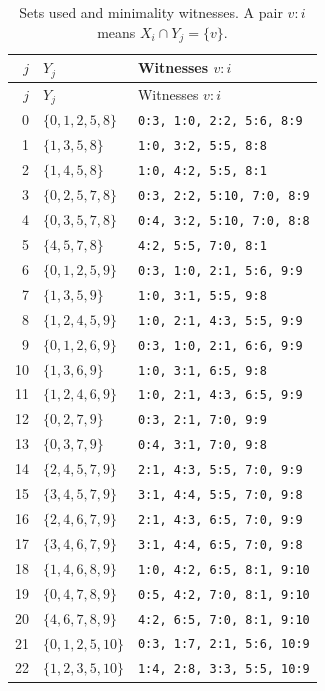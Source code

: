 \documentclass[11pt]{article}
\begin{document}
\begin{longtable}{rll}
\caption{Sets used and minimality witnesses. A pair $v:i$ means $X_i\cap Y_j=\{v\}$.}\label{tab:witness}\\
\toprule $j$&$Y_j$&Witnesses $v:i$\\\midrule\endfirsthead
\toprule $j$&$Y_j$&Witnesses $v:i$\\\midrule\endhead
0 & $\{0,1,2,5,8\}$ & \texttt{0:3, 1:0, 2:2, 5:6, 8:9} \\
1 & $\{1,3,5,8\}$ & \texttt{1:0, 3:2, 5:5, 8:8} \\
2 & $\{1,4,5,8\}$ & \texttt{1:0, 4:2, 5:5, 8:1} \\
3 & $\{0,2,5,7,8\}$ & \texttt{0:3, 2:2, 5:10, 7:0, 8:9} \\
4 & $\{0,3,5,7,8\}$ & \texttt{0:4, 3:2, 5:10, 7:0, 8:8} \\
5 & $\{4,5,7,8\}$ & \texttt{4:2, 5:5, 7:0, 8:1} \\
6 & $\{0,1,2,5,9\}$ & \texttt{0:3, 1:0, 2:1, 5:6, 9:9} \\
7 & $\{1,3,5,9\}$ & \texttt{1:0, 3:1, 5:5, 9:8} \\
8 & $\{1,2,4,5,9\}$ & \texttt{1:0, 2:1, 4:3, 5:5, 9:9} \\
9 & $\{0,1,2,6,9\}$ & \texttt{0:3, 1:0, 2:1, 6:6, 9:9} \\
10 & $\{1,3,6,9\}$ & \texttt{1:0, 3:1, 6:5, 9:8} \\
11 & $\{1,2,4,6,9\}$ & \texttt{1:0, 2:1, 4:3, 6:5, 9:9} \\
12 & $\{0,2,7,9\}$ & \texttt{0:3, 2:1, 7:0, 9:9} \\
13 & $\{0,3,7,9\}$ & \texttt{0:4, 3:1, 7:0, 9:8} \\
14 & $\{2,4,5,7,9\}$ & \texttt{2:1, 4:3, 5:5, 7:0, 9:9} \\
15 & $\{3,4,5,7,9\}$ & \texttt{3:1, 4:4, 5:5, 7:0, 9:8} \\
16 & $\{2,4,6,7,9\}$ & \texttt{2:1, 4:3, 6:5, 7:0, 9:9} \\
17 & $\{3,4,6,7,9\}$ & \texttt{3:1, 4:4, 6:5, 7:0, 9:8} \\
18 & $\{1,4,6,8,9\}$ & \texttt{1:0, 4:2, 6:5, 8:1, 9:10} \\
19 & $\{0,4,7,8,9\}$ & \texttt{0:5, 4:2, 7:0, 8:1, 9:10} \\
20 & $\{4,6,7,8,9\}$ & \texttt{4:2, 6:5, 7:0, 8:1, 9:10} \\
21 & $\{0,1,2,5,10\}$ & \texttt{0:3, 1:7, 2:1, 5:6, 10:9} \\
22 & $\{1,2,3,5,10\}$ & \texttt{1:4, 2:8, 3:3, 5:5, 10:9} \\

\end{longtable}
\end{document}
